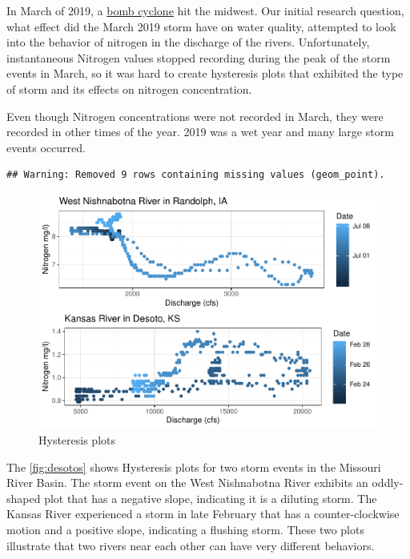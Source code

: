\documentclass[12pt,]{article}
\begin{document}
In March of 2019, a
\href{https://www.kansascity.com/news/state/missouri/article228237519.html}{bomb
cyclone} hit the midwest. Our initial research question, what effect did
the March 2019 storm have on water quality, attempted to look into the
behavior of nitrogen in the discharge of the rivers. Unfortunately,
instantaneous Nitrogen values stopped recording during the peak of the
storm events in March, so it was hard to create hysteresis plots that
exhibited the type of storm and its effects on nitrogen concentration.

Even though Nitrogen concentrations were not recorded in March, they
were recorded in other times of the year. 2019 was a wet year and many
large storm events occurred.

\begin{verbatim}
## Warning: Removed 9 rows containing missing values (geom_point).
\end{verbatim}

\begin{figure}
\centering
\includegraphics{Project_Template_files/figure-latex/desotos-1.pdf}
\caption{\label{fig:desotos} Hysteresis plots}
\end{figure}

The \autoref{fig:desotos} shows Hysteresis plots for two storm events in
the Missouri River Basin. The storm event on the West Nishnabotna River
exhibits an oddly-shaped plot that has a negative slope, indicating it
is a diluting storm. The Kansas River experienced a storm in late
February that has a counter-clockwise motion and a positive slope,
indicating a flushing storm. These two plots illustrate that two rivers
near each other can have very different behaviors.
\end{document}
